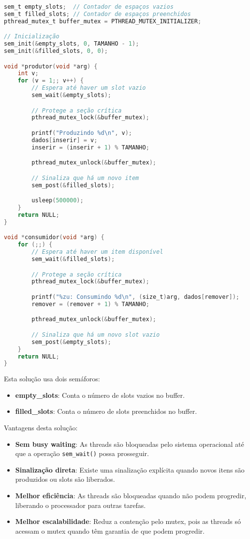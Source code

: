 \documentclass[12pt]{article}
\begin{document}
\begin{lstlisting}[language=C]
sem_t empty_slots;  // Contador de espaços vazios
sem_t filled_slots; // Contador de espaços preenchidos
pthread_mutex_t buffer_mutex = PTHREAD_MUTEX_INITIALIZER;

// Inicialização
sem_init(&empty_slots, 0, TAMANHO - 1);
sem_init(&filled_slots, 0, 0);

void *produtor(void *arg) {
    int v;
    for (v = 1;; v++) {
        // Espera até haver um slot vazio
        sem_wait(&empty_slots);

        // Protege a seção crítica
        pthread_mutex_lock(&buffer_mutex);

        printf("Produzindo %d\n", v);
        dados[inserir] = v;
        inserir = (inserir + 1) % TAMANHO;

        pthread_mutex_unlock(&buffer_mutex);

        // Sinaliza que há um novo item
        sem_post(&filled_slots);

        usleep(500000);
    }
    return NULL;
}

void *consumidor(void *arg) {
    for (;;) {
        // Espera até haver um item disponível
        sem_wait(&filled_slots);

        // Protege a seção crítica
        pthread_mutex_lock(&buffer_mutex);

        printf("%zu: Consumindo %d\n", (size_t)arg, dados[remover]);
        remover = (remover + 1) % TAMANHO;

        pthread_mutex_unlock(&buffer_mutex);

        // Sinaliza que há um novo slot vazio
        sem_post(&empty_slots);
    }
    return NULL;
}
\end{lstlisting}

Esta solução usa dois semáforos:
\begin{itemize}
    \item \textbf{empty\_slots}: Conta o número de slots vazios no buffer.
    \item \textbf{filled\_slots}: Conta o número de slots preenchidos no buffer.
\end{itemize}

Vantagens desta solução:
\begin{itemize}
    \item \textbf{Sem busy waiting}: As threads são bloqueadas pelo sistema operacional até que a operação \texttt{sem\_wait()} possa prosseguir.
    \item \textbf{Sinalização direta}: Existe uma sinalização explícita quando novos itens são produzidos ou slots são liberados.
    \item \textbf{Melhor eficiência}: As threads são bloqueadas quando não podem progredir, liberando o processador para outras tarefas.
    \item \textbf{Melhor escalabilidade}: Reduz a contenção pelo mutex, pois as threads só acessam o mutex quando têm garantia de que podem progredir.
\end{itemize}
\end{document}
